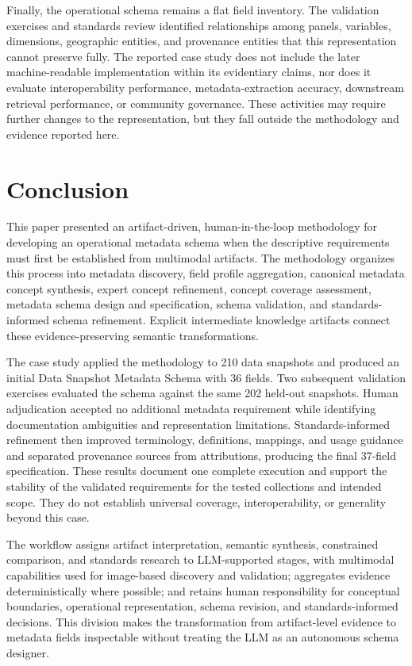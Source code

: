 \documentclass{article}
\begin{document}
Finally, the operational schema remains a flat field inventory. The validation exercises and standards review identified relationships among panels, variables, dimensions, geographic entities, and provenance entities that this representation cannot preserve fully. The reported case study does not include the later machine-readable implementation within its evidentiary claims, nor does it evaluate interoperability performance, metadata-extraction accuracy, downstream retrieval performance, or community governance. These activities may require further changes to the representation, but they fall outside the methodology and evidence reported here.

\section{Conclusion}

This paper presented an artifact-driven, human-in-the-loop methodology for developing an operational metadata schema when the descriptive requirements must first be established from multimodal artifacts. The methodology organizes this process into metadata discovery, field profile aggregation, canonical metadata concept synthesis, expert concept refinement, concept coverage assessment, metadata schema design and specification, schema validation, and standards-informed schema refinement. Explicit intermediate knowledge artifacts connect these evidence-preserving semantic transformations.

The case study applied the methodology to 210 data snapshots and produced an initial Data Snapshot Metadata Schema with 36 fields. Two subsequent validation exercises evaluated the schema against the same 202 held-out snapshots. Human adjudication accepted no additional metadata requirement while identifying documentation ambiguities and representation limitations. Standards-informed refinement then improved terminology, definitions, mappings, and usage guidance and separated provenance sources from attributions, producing the final 37-field specification. These results document one complete execution and support the stability of the validated requirements for the tested collections and intended scope. They do not establish universal coverage, interoperability, or generality beyond this case.

The workflow assigns artifact interpretation, semantic synthesis, constrained comparison, and standards research to LLM-supported stages, with multimodal capabilities used for image-based discovery and validation; aggregates evidence deterministically where possible; and retains human responsibility for conceptual boundaries, operational representation, schema revision, and standards-informed decisions. This division makes the transformation from artifact-level evidence to metadata fields inspectable without treating the LLM as an autonomous schema designer.
\end{document}
